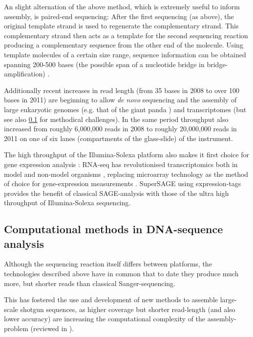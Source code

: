An slight alternation of the above method, which is extremely useful
to inform assembly, is paired-end sequencing: After the first
sequencing (as above), the original template strand is used to
regenerate the complementary strand. This complementary strand then
acts as a template for the second sequencing reaction producing a
complementary sequence from the other end of the molecule. Using
template molecules of a certain size range, sequence information can
be obtained spanning 200-500 bases (the possible span of a nucleotide
bridge in bridge-amplification) \cite{pmid18987734}.

Additionally recent increases in read length (from 35 bases in 2008 to
over 100 bases in 2011) are beginning to allow \textit{de novo}
sequencing and the assembly of large eukaryotic genomes (e.g. that of
the giant panda \cite{pmid20010809}) and transcriptomes
\cite{pmid21679424} (but see also \ref{sec:comp-meth-dna} for
methodical challenges). In the same period throughput also increased
from roughly 6,000,000 reads in 2008 to roughly 20,000,000 reads in
2011 on one of six lanes (compartments of the glass-slide) of the
instrument.

The high throughput of the Illumina-Solexa platform also makes it
first choice for gene expression analysis \cite{pmid21627854}: RNA-seq
has revolutionised transcriptomics both in model and non-model
organisms \cite{pmid19015660}, replacing microarray technology as the
method of choice for gene-expression measurements \cite{pmid18927111}.
SuperSAGE \cite{pmid20967605} using expression-tags provides the
benefit of classical SAGE-analysis \cite{pmid7570003} with those of
the ultra high throughput of Illumina-Solexa sequencing.

\subsection{Computational methods in DNA-sequence analysis}
\label{sec:comp-meth-dna}

Although the sequencing reaction itself differs between platforms, the
technologies described above have in common that to date they produce
much more, but shorter reads than classical Sanger-sequencing.

This has fostered the use and development of new methods to assemble
large-scale shotgun sequences, as higher coverage but shorter
read-length (and also lower accuracy) are increasing the computational
complexity of the assembly-problem (reviewed in \cite{pmid20211242}).

